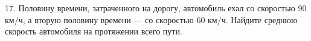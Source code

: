 17. Половину времени, затраченного на дорогу, автомобиль ехал со скоростью 90 км/ч, а вторую половину времени --- со скоростью 60 км/ч. Найдите среднюю скорость автомобиля на протяжении всего пути.\\
